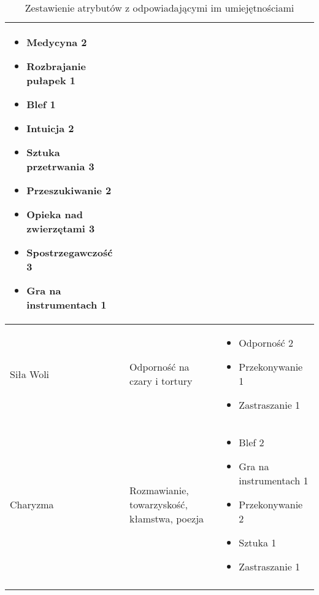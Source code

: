 \begin{longtable}[c]{m{}m{}m{}}
\begin{itemize}
		\item Medycyna 2
		\item Rozbrajanie pułapek 1
		\item Blef 1
		\item Intuicja 2
		\item Sztuka przetrwania 3
		\item Przeszukiwanie 2
		\item Opieka nad zwierzętami 3
		\item Spostrzegawczość 3
		\item Gra na instrumentach 1
	\end{itemize}\\ \midrule
	Siła Woli &
	Odporność na czary i tortury &
	\begin{itemize}
		\item Odporność 2
		\item Przekonywanie 1
		\item Zastraszanie 1
	\end{itemize}\\ \midrule
	Charyzma &
	Rozmawianie, towarzyskość, kłamstwa, poezja &
	\begin{itemize}
		\item Blef 2
		\item Gra na instrumentach 1
		\item Przekonywanie 2
		\item Sztuka 1
		\item Zastraszanie 1
	\end{itemize}
	\\ \bottomrule

\caption{Zestawienie atrybutów z odpowiadającymi im umiejętnościami}
\label{tab:attr}
\end{longtable}

